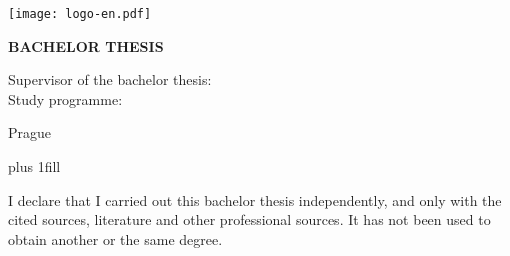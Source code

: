 

\pagestyle{empty}
\hypersetup{pageanchor=false}
\begin{center}
	
	\centerline{\mbox{\texttt{[image: logo-en.pdf]}}}
	
	\vspace{-8mm}
	\vfill
	
	{\bf\Large BACHELOR THESIS}
	
	\vfill
	
	{\LARGE\ThesisAuthor}
	
	\vspace{15mm}
	
	{\LARGE\bfseries
		\parbox{\textwidth}{\baselineskip\centering\ThesisTitle}
	}
	
	\vfill
	
	\Department
	
	\vfill
	
	\iffalse
	{
		\centerline{\vbox{\halign{\hbox to 0.45\hsize{\hfil #}&\hskip 0.5em\parbox[t]{0.45\hsize}{\raggedright #}\cr
					Supervisor of the bachelor thesis:&\Supervisor \cr
					\noalign{\vspace{2mm}}
					Study programme:&\StudyProgramme \cr
	}}}}
	\fi
	
	Supervisor of the bachelor thesis: \Supervisor\\
	\vspace{2mm}
	Study programme: \StudyProgramme
	
	\vfill
	
	Prague \YearSubmitted
	
\end{center}

\newpage



\openright
\hypersetup{pageanchor=true}
\pagestyle{plain}
\vglue 0pt plus 1fill

\noindent
I declare that I carried out this bachelor thesis independently, and only with the cited
sources, literature and other professional sources. It has not been used to obtain another
or the same degree.

